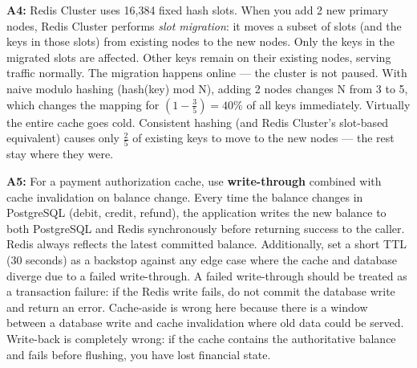 \documentclass[11pt,a4paper]{article}
\begin{document}
\begin{answerbox}
\textbf{A4:} Redis Cluster uses 16,384 fixed hash slots. When you add 2 new primary nodes, Redis Cluster performs \emph{slot migration}: it moves a subset of slots (and the keys in those slots) from existing nodes to the new nodes. Only the keys in the migrated slots are affected. Other keys remain on their existing nodes, serving traffic normally. The migration happens online --- the cluster is not paused. With naive modulo hashing (hash(key) mod N), adding 2 nodes changes N from 3 to 5, which changes the mapping for $(1 - \frac{3}{5}) = 40\%$ of all keys immediately. Virtually the entire cache goes cold. Consistent hashing (and Redis Cluster's slot-based equivalent) causes only $\frac{2}{5}$ of existing keys to move to the new nodes --- the rest stay where they were.

\vspace{8pt}

\textbf{A5:} For a payment authorization cache, use \textbf{write-through} combined with cache invalidation on balance change. Every time the balance changes in PostgreSQL (debit, credit, refund), the application writes the new balance to both PostgreSQL and Redis synchronously before returning success to the caller. Redis always reflects the latest committed balance. Additionally, set a short TTL (30 seconds) as a backstop against any edge case where the cache and database diverge due to a failed write-through. A failed write-through should be treated as a transaction failure: if the Redis write fails, do not commit the database write and return an error. Cache-aside is wrong here because there is a window between a database write and cache invalidation where old data could be served. Write-back is completely wrong: if the cache contains the authoritative balance and fails before flushing, you have lost financial state.
\end{answerbox}
\end{document}
